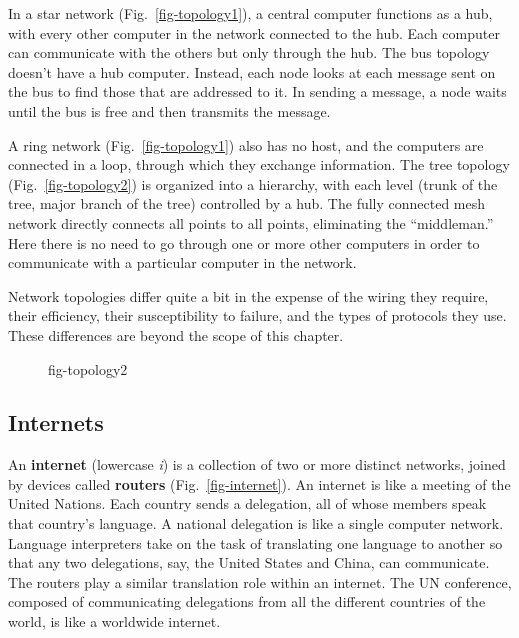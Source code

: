 In a star network (Fig.~\ref{fig-topology1}), a central computer
functions as a hub, with every other computer in the network connected
to the hub.  Each computer can communicate with the others but only
through the hub.  The bus topology doesn't have a hub computer.
Instead, each node looks at each message sent on the  bus to find
those that are addressed to it. In sending a message, a node waits
until the bus is free and then transmits the message.

A ring network (Fig.~\ref{fig-topology1}) also has no host, and the
computers are connected in a loop, through which they exchange
information.  The tree topology (Fig.~\ref{fig-topology2}) is
organized into a hierarchy, with each level (trunk of the tree, major
branch of the tree) controlled by a hub.  The fully connected mesh
network directly connects all points to all points, eliminating the
``middleman.''  Here there is no need to go through one or more other
computers in order to communicate with a particular computer in the
network.

Network topologies differ quite a bit in the expense of the wiring
they require, their efficiency, their susceptibility to failure, and
the types of protocols they use.   These
differences are beyond the scope of this chapter.

\begin{figure}[tb]
{fig-topology2}
\end{figure}

\subsection{Internets}
\noindent An {\bf internet} (lowercase {\it i}) is a collection of two or more
distinct networks, joined by devices called {\bf routers}
(Fig.~\ref{fig-internet}).  An internet is like a meeting of the
United Nations.  Each country sends a delegation, all of whose members
speak that country's language.  A national delegation is like a single
computer network.  Language interpreters take on the task of
translating one language to another so that any two delegations, say,
the United States and China, can communicate.  The routers play a
similar translation role within an internet.  The UN conference,
composed of communicating delegations from all the different
countries of the world, is like a worldwide internet.

